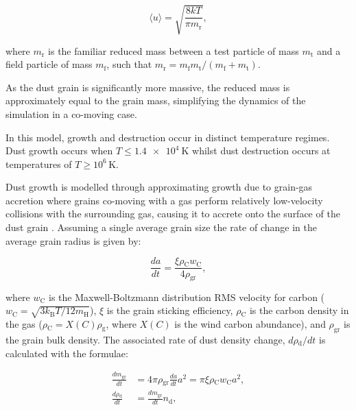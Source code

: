 \documentclass[fleqn,usenatbib]{mnras}
\newcommand{\rms}[1]{\ensuremath{_{\text{#1}}}}
\begin{document}
\begin{equation}
  \langle u \rangle = \sqrt{\frac{8kT}{\pi m \rms r}} ,
\end{equation}

\noindent
where $m \rms r$ is the familiar reduced mass between a test particle of mass $m \rms t$ and a field particle of mass $m \rms f$, such that $m \rms r = m \rms f m \rms t / (m \rms f + m \rms t)$.

\noindent
As the dust grain is significantly more massive, the reduced mass is approximately equal to the grain mass, simplifying the dynamics of the simulation in a co-moving case.

In this model, growth and destruction occur in distinct temperature regimes.
Dust growth occurs when $T \leq \SI{1.4e4}{\kelvin}$ whilst dust destruction occurs at temperatures of $T \geq 10^6 \, \si{\kelvin}$.

Dust growth is modelled through approximating growth due to grain-gas accretion where grains co-moving with a gas perform relatively low-velocity collisions with the surrounding gas, causing it to accrete onto the surface of the dust grain 
\citep{spitzer_jr._physical_2008}.
Assuming a single average grain size the rate of change in the average grain radius is given by:

\begin{equation}
  \frac{da}{dt} = \frac{\xi \rho\rms{C} w_\text{C}}{4 \rho\rms{gr}} ,
\end{equation}

\noindent
where $w\rms{C}$ is the Maxwell-Boltzmann distribution RMS velocity for carbon ($w\rms{C} = \sqrt{3 k\rms{B} T/12 m\rms{H}}$), $\xi$ is the grain sticking efficiency, $\rho\rms{C}$ is the carbon density in the gas ($\rho\rms{C} = X(C)\rho\rms{g}$, where $X(C)$ is the wind carbon abundance), and $\rho_\text{gr}$ is the grain bulk density.
The associated rate of dust density change, $d\rho\rms{d}/dt$ is calculated with the formulae:



\begin{subequations}
  \begin{align}
    \frac{dm\rms{gr}}{dt} & = 4\pi \rho\rms{gr} \frac{da}{dt} a^2 = \pi \xi \rho\rms{C} w\rms{C} a^2, \\
    \frac{d\rho\rms{d}}{dt} & = \frac{dm\rms{gr}}{dt} n\rms{d} ,
  \end{align}
\end{subequations}
\end{document}
